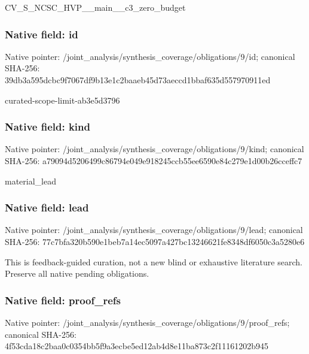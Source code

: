 \documentclass[10pt,a4paper]{article}
\begin{document}
\begingroup\raggedright\sloppy CV\_\allowbreak{}S\_\allowbreak{}NCSC\_\allowbreak{}HVP\_\allowbreak{}\_\allowbreak{}main\_\allowbreak{}\_\allowbreak{}c3\_\allowbreak{}zero\_\allowbreak{}budget\par\endgroup

\subsubsection{Native field: id}
Native pointer: /joint\_\allowbreak{}analysis/synthesis\_\allowbreak{}coverage/obligations/9/id; canonical SHA-256: 39db3a595dcbc9f7067df9b13e1c2baaeb45d73aeccd1bbaf635d557970911ed

\begingroup\raggedright\sloppy curated-scope-limit-ab3e5d3796\par\endgroup

\subsubsection{Native field: kind}
Native pointer: /joint\_\allowbreak{}analysis/synthesis\_\allowbreak{}coverage/obligations/9/kind; canonical SHA-256: a79094d5206499c86794e049e918245ccb55ee6590e84c279e1d00b26cceffc7

\begingroup\raggedright\sloppy material\_\allowbreak{}lead\par\endgroup

\subsubsection{Native field: lead}
Native pointer: /joint\_\allowbreak{}analysis/synthesis\_\allowbreak{}coverage/obligations/9/lead; canonical SHA-256: 77c7bfa320b590e1beb7a14ec5097a427bc13246621fe8348df6050c3a5280e6

\begingroup\raggedright\sloppy This is feedback-guided curation,\allowbreak{} not a new blind or exhaustive literature search. Preserve all native pending obligations.\par\endgroup

\subsubsection{Native field: proof\_\allowbreak{}refs}
Native pointer: /joint\_\allowbreak{}analysis/synthesis\_\allowbreak{}coverage/obligations/9/proof\_\allowbreak{}refs; canonical SHA-256: 4f53cda18c2baa0c0354bb5f9a3ecbe5ed12ab4d8e11ba873c2f11161202b945
\end{document}
